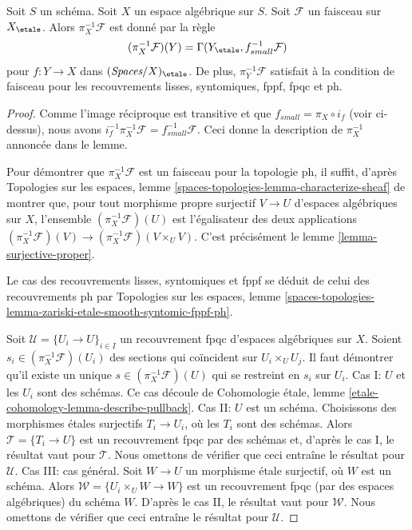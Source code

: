 \begin{lemma}
\label{lemma-describe-pullback}
Soit $S$ un schéma. Soit $X$ un espace algébrique sur $S$.
Soit $\mathcal{F}$ un faisceau sur $X_\etale$. Alors
$\pi_X^{-1}\mathcal{F}$ est donné par la règle
$$
(\pi_X^{-1}\mathcal{F})(Y) = \Gamma(Y_\etale, f_{small}^{-1}\mathcal{F})
$$
pour $f : Y \to X$ dans $(\textit{Spaces}/X)_\etale$.
De plus, $\pi_Y^{-1}\mathcal{F}$ satisfait à la condition de faisceau pour les
recouvrements lisses, syntomiques, fppf, fpqc et ph.
\end{lemma}

\begin{proof}
Comme l'image réciproque est transitive et que $f_{small} = \pi_X \circ i_f$
(voir ci-dessus), nous avons
$i_f^{-1} \pi_X^{-1}\mathcal{F} = f_{small}^{-1}\mathcal{F}$.
Ceci donne la description de $\pi_X^{-1}$ annoncée dans le lemme.

\medskip\noindent
Pour démontrer que $\pi_X^{-1}\mathcal{F}$ est un faisceau pour la topologie ph,
il suffit, d'après Topologies sur les espaces, lemme
\ref{spaces-topologies-lemma-characterize-sheaf}
de montrer que, pour tout morphisme propre surjectif
$V \to U$ d'espaces algébriques sur $X$, l'ensemble
$(\pi_X^{-1}\mathcal{F})(U)$ est l'égalisateur des deux applications
$(\pi_X^{-1}\mathcal{F})(V) \to (\pi_X^{-1}\mathcal{F})(V \times_U V)$.
C'est précisément le lemme \ref{lemma-surjective-proper}.

\medskip\noindent
Le cas des recouvrements lisses, syntomiques et fppf se déduit de celui
des recouvrements ph par Topologies sur les espaces, lemme
\ref{spaces-topologies-lemma-zariski-etale-smooth-syntomic-fppf-ph}.

\medskip\noindent
Soit $\mathcal{U} = \{U_i \to U\}_{i \in I}$ un recouvrement fpqc d'espaces
algébriques sur $X$. Soient $s_i \in (\pi_X^{-1}\mathcal{F})(U_i)$ des sections
qui coïncident sur $U_i \times_U U_j$. Il faut démontrer qu'il existe un unique
$s \in (\pi_X^{-1}\mathcal{F})(U)$ qui se restreint en $s_i$ sur $U_i$.
Cas I: $U$ et les $U_i$ sont des schémas. Ce cas découle de
Cohomologie étale, lemme \ref{etale-cohomology-lemma-describe-pullback}.
Cas II: $U$ est un schéma. Choisissons des morphismes étales surjectifs
$T_i \to U_i$, où les $T_i$ sont des schémas. Alors
$\mathcal{T} = \{T_i \to U\}$ est un recouvrement fpqc par des schémas et,
d'après le cas I, le résultat vaut pour $\mathcal{T}$. Nous omettons de vérifier
que ceci entraîne le résultat pour $\mathcal{U}$.
Cas III: cas général. Soit $W \to U$ un morphisme étale surjectif, où $W$ est
un schéma. Alors $\mathcal{W} = \{U_i \times_U W \to W\}$ est un recouvrement
fpqc (par des espaces algébriques) du schéma $W$.
D'après le cas II, le résultat vaut pour $\mathcal{W}$. Nous omettons de vérifier
que ceci entraîne le résultat pour $\mathcal{U}$.
\end{proof}

